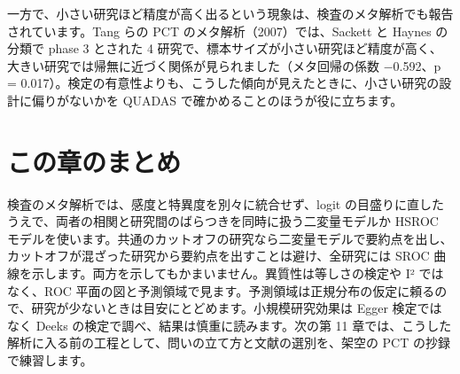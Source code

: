 一方で、小さい研究ほど精度が高く出るという現象は、検査のメタ解析でも報告されています。Tang らの PCT のメタ解析（2007）では、Sackett と Haynes の分類で phase 3 とされた 4 研究で、標本サイズが小さい研究ほど精度が高く、大きい研究では帰無に近づく関係が見られました（メタ回帰の係数 −0.592、p = 0.017）。検定の有意性よりも、こうした傾向が見えたときに、小さい研究の設計に偏りがないかを QUADAS で確かめることのほうが役に立ちます。

\section{この章のまとめ}
\label{sec:10-9}

検査のメタ解析では、感度と特異度を別々に統合せず、logit の目盛りに直したうえで、両者の相関と研究間のばらつきを同時に扱う二変量モデルか HSROC モデルを使います。共通のカットオフの研究なら二変量モデルで要約点を出し、カットオフが混ざった研究から要約点を出すことは避け、全研究には SROC 曲線を示します。両方を示してもかまいません。異質性は等しさの検定や I² ではなく、ROC 平面の図と予測領域で見ます。予測領域は正規分布の仮定に頼るので、研究が少ないときは目安にとどめます。小規模研究効果は Egger 検定ではなく Deeks の検定で調べ、結果は慎重に読みます。次の第 11 章では、こうした解析に入る前の工程として、問いの立て方と文献の選別を、架空の PCT の抄録で練習します。
